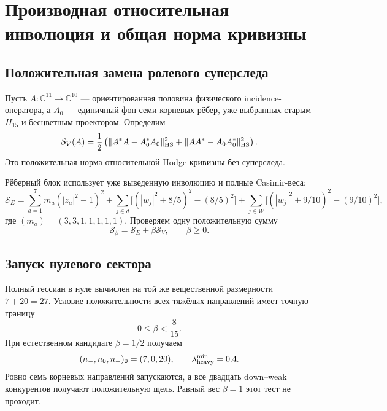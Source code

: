 \chapter{Производная относительная инволюция и общая норма кривизны}
\label{ch:v7-derived-relative-involution-curvature-norm-gate}

\section{Положительная замена ролевого суперследа}

Пусть $A:\mathbb C^{11}\to\mathbb C^{10}$ --- ориентированная половина
физического incidence-оператора, а $A_0$ --- единичный фон семи корневых
рёбер, уже выбранных старым $H_{15}$ и бесцветным проектором. Определим
\begin{equation}
 \mathcal S_V(A)=\frac12\left(
 \|A^*A-A_0^*A_0\|_{\rm HS}^2+
 \|AA^*-A_0A_0^*\|_{\rm HS}^2\right).
 \label{eq:v7-relative-norm-vertex-action}
\end{equation}
Это положительная норма относительной Hodge-кривизны без суперследа.

Рёберный блок использует уже выведенную инволюцию и полные Casimir-веса:
\begin{equation}
 \mathcal S_E=
 \sum_{a=1}^7m_a(|z_a|^2-1)^2
 +\sum_{j\in d}\bigl[(|w_j|^2+8/5)^2-(8/5)^2\bigr]
 +\sum_{j\in W}\bigl[(|w_j|^2+9/10)^2-(9/10)^2\bigr],
 \label{eq:v7-relative-norm-edge-action}
\end{equation}
где $(m_a)=(3,3,1,1,1,1,1)$. Проверяем одну положительную сумму
\begin{equation}
 \mathcal S_\beta=\mathcal S_E+\beta\mathcal S_V,
 \qquad \beta\ge0.
 \label{eq:v7-relative-norm-combined-action}
\end{equation}

\section{Запуск нулевого сектора}

Полный гессиан в нуле вычислен на той же вещественной размерности
$7+20=27$. Условие положительности всех тяжёлых направлений имеет точную
границу
\begin{equation}
 0\le\beta<\frac8{15}.
 \label{eq:v7-relative-norm-beta-window}
\end{equation}
При естественном кандидате $\beta=1/2$ получаем
\begin{equation}
 (n_-,n_0,n_+)_{0}=(7,0,20),
 \qquad \lambda_{\rm heavy}^{\min}=0.4.
 \label{eq:v7-relative-norm-origin-signature}
\end{equation}
Ровно семь корневых направлений запускаются, а все двадцать down--weak
конкурентов получают положительную щель. Равный вес $\beta=1$ этот тест не
проходит.

